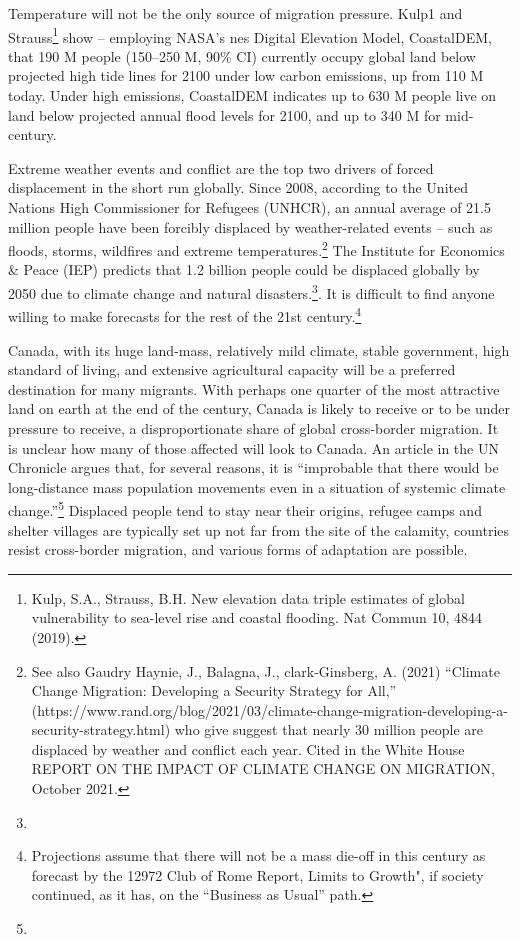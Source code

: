 Temperature will not be the only source of migration pressure. Kulp1 and Strauss\footnote{Kulp, S.A., Strauss, B.H. New elevation data triple estimates of global vulnerability to sea-level rise and coastal flooding. Nat Commun 10, 4844 (2019). %
} show – employing NASA’s nes Digital Elevation Model, CoastalDEM, that 190 M people (150–250 M, 90\% CI) currently occupy global land below projected high tide lines for 2100 under low carbon emissions, up from 110 M today. Under high emissions, CoastalDEM indicates up to 630 M people live on land below projected annual flood levels for 2100, and up to 340 M for mid-century.

Extreme weather events and conflict are the top two drivers of forced displacement in the short run globally. Since 2008, according to the United Nations High Commissioner for Refugees (UNHCR), an annual average of 21.5 million people have been forcibly displaced by weather-related events – such as floods, storms, wildfires and extreme temperatures.\footnote{
See also Gaudry Haynie, J., Balagna, J., clark-Ginsberg, A. (2021) “Climate Change Migration: Developing a Security Strategy for All,” (https://www.rand.org/blog/2021/03/climate-change-migration-developing-a-security-strategy.html) who give suggest that nearly 30 million people  are displaced by weather and  conflict each year. Cited in the White House REPORT ON THE IMPACT OF CLIMATE CHANGE ON MIGRATION, October 2021. } The Institute for Economics \& Peace (IEP)  predicts that 1.2 billion people could be displaced globally by 2050 due to climate change and natural disasters.\footnote{
}. It is difficult to find anyone willing to make forecasts for the rest of the 21st century.\footnote{Projections assume that there will not be a mass die-off in this century as forecast by the 12972 Club of Rome Report, Limits to Growth", if society continued, as it has, on the ``Business as Usual'' path. }  



Canada, with its huge land-mass, relatively mild climate, stable government, high standard of living, and extensive agricultural capacity will be a preferred destination for many migrants. With perhaps one quarter of the most attractive land on earth at the end of the century, Canada is likely to receive or to be under  pressure to receive, a disproportionate share of global cross-border migration. It is unclear how many of those affected will look to Canada. An article in the UN Chronicle argues that, for several reasons,  it is ``improbable that there would be long-distance mass population movements even in a situation of systemic climate change.''\footnote{
}  Displaced people tend to stay near their origins, refugee camps and shelter villages are typically set up not far from the site of the calamity, countries resist cross-border migration, and various forms of adaptation are possible.  


